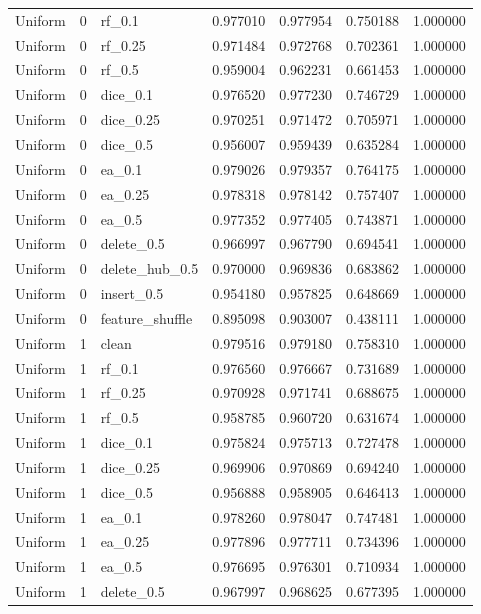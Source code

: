 \documentclass[UTF8,a4paper,11pt,fontset=fandol]{ctexart}
\begin{document}
{\begin{longtable}{lrlrrrr}
Uniform & 0 & rf\_0.1 & 0.977010 & 0.977954 & 0.750188 & 1.000000 \\
Uniform & 0 & rf\_0.25 & 0.971484 & 0.972768 & 0.702361 & 1.000000 \\
Uniform & 0 & rf\_0.5 & 0.959004 & 0.962231 & 0.661453 & 1.000000 \\
Uniform & 0 & dice\_0.1 & 0.976520 & 0.977230 & 0.746729 & 1.000000 \\
Uniform & 0 & dice\_0.25 & 0.970251 & 0.971472 & 0.705971 & 1.000000 \\
Uniform & 0 & dice\_0.5 & 0.956007 & 0.959439 & 0.635284 & 1.000000 \\
Uniform & 0 & ea\_0.1 & 0.979026 & 0.979357 & 0.764175 & 1.000000 \\
Uniform & 0 & ea\_0.25 & 0.978318 & 0.978142 & 0.757407 & 1.000000 \\
Uniform & 0 & ea\_0.5 & 0.977352 & 0.977405 & 0.743871 & 1.000000 \\
Uniform & 0 & delete\_0.5 & 0.966997 & 0.967790 & 0.694541 & 1.000000 \\
Uniform & 0 & delete\_hub\_0.5 & 0.970000 & 0.969836 & 0.683862 & 1.000000 \\
Uniform & 0 & insert\_0.5 & 0.954180 & 0.957825 & 0.648669 & 1.000000 \\
Uniform & 0 & feature\_shuffle & 0.895098 & 0.903007 & 0.438111 & 1.000000 \\
Uniform & 1 & clean & 0.979516 & 0.979180 & 0.758310 & 1.000000 \\
Uniform & 1 & rf\_0.1 & 0.976560 & 0.976667 & 0.731689 & 1.000000 \\
Uniform & 1 & rf\_0.25 & 0.970928 & 0.971741 & 0.688675 & 1.000000 \\
Uniform & 1 & rf\_0.5 & 0.958785 & 0.960720 & 0.631674 & 1.000000 \\
Uniform & 1 & dice\_0.1 & 0.975824 & 0.975713 & 0.727478 & 1.000000 \\
Uniform & 1 & dice\_0.25 & 0.969906 & 0.970869 & 0.694240 & 1.000000 \\
Uniform & 1 & dice\_0.5 & 0.956888 & 0.958905 & 0.646413 & 1.000000 \\
Uniform & 1 & ea\_0.1 & 0.978260 & 0.978047 & 0.747481 & 1.000000 \\
Uniform & 1 & ea\_0.25 & 0.977896 & 0.977711 & 0.734396 & 1.000000 \\
Uniform & 1 & ea\_0.5 & 0.976695 & 0.976301 & 0.710934 & 1.000000 \\
Uniform & 1 & delete\_0.5 & 0.967997 & 0.968625 & 0.677395 & 1.000000 \\

\end{longtable}}
\end{document}
